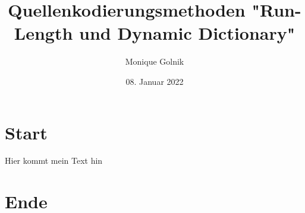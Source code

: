 \documentclass[11pt,a4paper]{report}
\date{08. Januar 2022}
\title{Quellenkodierungsmethoden "Run-Length und Dynamic Dictionary"}
\author{Monique Golnik}
\begin{document}
	\maketitle
	\tableofcontents
	\listoffigures
	
	\section{Start}
	
	Hier kommt mein Text hin
	
	\section{Ende}
\end{document}
